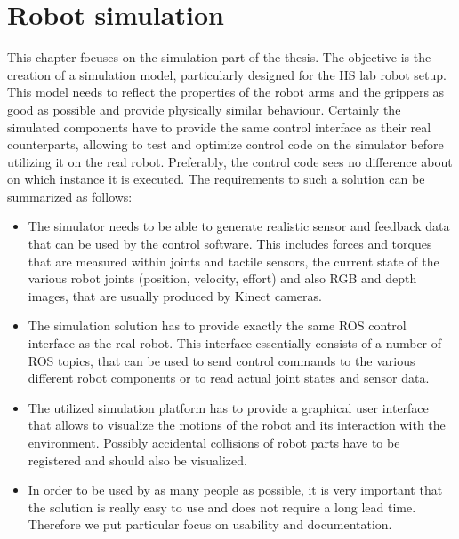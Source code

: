 
\chapter{Robot simulation}
\label{chap:simulation}

This chapter focuses on the simulation part of the thesis. The objective is the creation of a simulation model, particularly designed for the IIS lab robot setup. This model needs to reflect the properties of the robot arms and the grippers as good as possible and provide physically similar behaviour. Certainly the simulated components have to provide the same control interface as their real counterparts, allowing to test and optimize control code on the simulator before utilizing it on the real robot. Preferably, the control code sees no difference about on which instance it is executed. The requirements to such a solution can be summarized as follows: 

\begin{itemize}

\item
The simulator needs to be able to generate realistic sensor and feedback data that can be used by the control software. This includes forces and torques that are measured within joints and tactile sensors, the current state of the various robot joints (position, velocity, effort) and also RGB and depth images, that are usually produced by Kinect cameras.

\item
The simulation solution has to provide exactly the same ROS control interface as the real robot. This interface essentially consists of a number of ROS topics, that can be used to send control commands to the various different robot components or to read actual joint states and sensor data.
 
\item
The utilized simulation platform has to provide a graphical user interface that allows to visualize the motions of the robot and its interaction with the environment. Possibly accidental collisions of  robot parts have to be registered and should also be visualized.

\item
In order to be used by as many people as possible, it is very important that the solution is really easy to use and does not require a long lead time. Therefore we put particular focus on usability and documentation.

\end{itemize}


